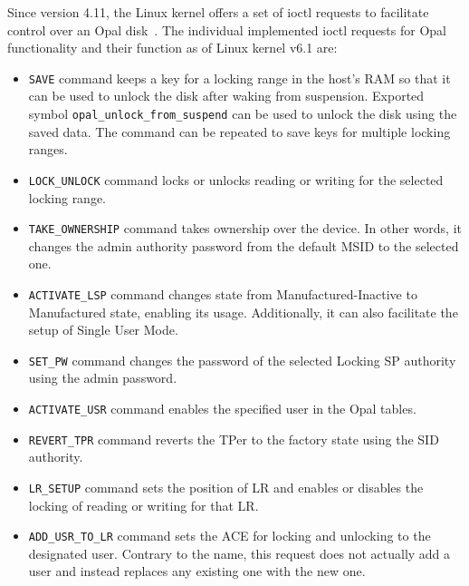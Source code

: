 Since version 4.11, the Linux kernel offers a set of ioctl requests to facilitate control over an Opal disk~\cite{linux-opal-introduction-mail}. 
The individual implemented ioctl requests for Opal functionality and their function as of Linux kernel v6.1 are:
\begin{itemize}
\item \verb|SAVE| command keeps a key for a locking range in the host's RAM so that it can be used to unlock the disk after waking from suspension. Exported symbol \verb|opal_unlock_from_suspend| can be used to unlock the disk using the saved data. The command can be repeated to save keys for multiple locking ranges. %
\item \verb|LOCK_UNLOCK| command locks or unlocks reading or writing for the selected locking range.
\item \verb|TAKE_OWNERSHIP| command takes ownership over the device. In other words, it changes the admin authority password from the default MSID to the selected one. 
\item \verb|ACTIVATE_LSP| command changes state from Manufactured-Inactive to Manufactured state, enabling its usage. Additionally, it can also facilitate the setup of Single User Mode. 
\item \verb|SET_PW| command changes the password of the selected Locking SP authority using the admin password.
\item \verb|ACTIVATE_USR| command enables the specified user in the Opal tables.
\item \verb|REVERT_TPR| command reverts the TPer to the factory state using the SID authority.
\item \verb|LR_SETUP| command sets the position of LR and enables or disables the locking of reading or writing for that LR.
\item \verb|ADD_USR_TO_LR| command sets the ACE for locking and unlocking to the designated user. Contrary to the name, this request does not actually add a user and instead replaces any existing one with the new one. %

\end{itemize}
